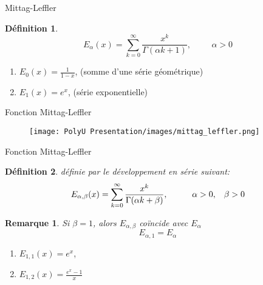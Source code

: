 \documentclass{sintefbeamer}
\newtheorem{def1}{Définition}
\newtheorem{rema1}{Remarque}
\begin{document}
\begin{frame}{Mittag-Leffler}
    \begin{def1}
    \begin{equation}\label{def:mittag-leffler1}
        E_{\alpha}(x) = \sum _{k=0}^{\infty} \frac{x^k}{\Gamma(\alpha k +1)}, \hspace{1cm} \alpha>0
    \end{equation}
\end{def1}
\begin{example}
    \begin{enumerate}
        \item $E_0(x) = \frac{1}{1-x}$, (somme d'une série géométrique)
        \item $E_1(x) = e^x $, (série exponentielle)
    \end{enumerate}
\end{example}
\end{frame}

\begin{frame}{Fonction Mittag-Leffler}
    \begin{figure}[H]
    \centering
    \texttt{[image: PolyU Presentation/images/mittag\_leffler.png]}

\end{figure}
\end{frame}
\begin{frame}{Fonction Mittag-Leffler}
    \begin{def1}
définie par le développement en série suivant:
    \begin{equation}\label{def:mittag-leffler2}
        E_{\alpha, \beta}(x) = \sum _{k=0}^{\infty} \frac{x^k}{\Gamma(\alpha k +\beta)}, \hspace{1cm} \alpha>0, \hspace{0.3cm}\beta>0
    \end{equation}
\end{def1}
\begin{rema1}
    Si $\beta =1$, alors $E_{\alpha, \beta}$ coïncide avec $E_{\alpha}$
    \begin{equation}
        E_{\alpha, 1}=E_{\alpha}
    \end{equation}
\end{rema1}
\begin{example}
        \begin{enumerate}
            \item $E_{1,1} (x)= e^x$,
            \item $E_{1,2}(x) = \frac{e^x - 1}{x}$
        \end{enumerate}
    \end{example}
\end{frame}
\end{document}
